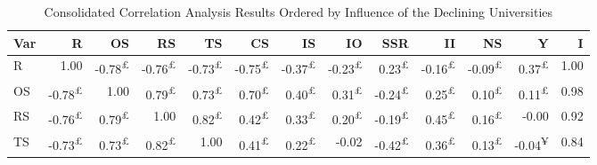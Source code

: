 \documentclass{singlecol-new}
\theoremstyle{TH}{
\newtheorem{lemma}{Lemma}
\newtheorem{theorem}[lemma]{Theorem}
\newtheorem{corrolary}[lemma]{Corrolary}
\newtheorem{conjecture}[lemma]{Conjecture}
\newtheorem{proposition}[lemma]{Proposition}
\newtheorem{claim}[lemma]{Claim}
\newtheorem{stheorem}[lemma]{Wrong Theorem}
\newtheorem{algorithm}{Algorithm}
}
\theoremstyle{THrm}{
\newtheorem{definition}{Definition}[section]
\newtheorem{question}{Question}[section]
\newtheorem{remark}{Remark}
\newtheorem{scheme}{Scheme}
}
\theoremstyle{THhit}{
\newtheorem{case}{Case}[section]
}
\begin{document}
\begin{table*}[h!]
	\centering
	\caption{Consolidated Correlation Analysis Results Ordered by Influence of the Declining Universities}
	\label{tab:correlation_combined_colored}
	\scriptsize
	\begin{tabular}{|l|r|r|r|r|r|r|r|r|r|r|r|r|}
		\hline
		\textbf{Var} & \textbf{R} & \textbf{OS} & \textbf{RS} & \textbf{TS} & \textbf{CS} & \textbf{IS} & \textbf{IO} & \textbf{SSR} & \textbf{II} & \textbf{NS} & \textbf{Y} & \textbf{I} \\ \hline
		
		R & \cellcolor{gray!50}1.00 & \cellcolor{gray!39}-0.78\textsuperscript{£} & \cellcolor{gray!38}-0.76\textsuperscript{£} & \cellcolor{gray!36}-0.73\textsuperscript{£} & \cellcolor{gray!37}-0.75\textsuperscript{£} & \cellcolor{gray!18}-0.37\textsuperscript{£} & \cellcolor{gray!11}-0.23\textsuperscript{£} & \cellcolor{gray!11}0.23\textsuperscript{£} & \cellcolor{gray!8}-0.16\textsuperscript{£} & \cellcolor{gray!4}-0.09\textsuperscript{£} & \cellcolor{gray!18}0.37\textsuperscript{£} & 1.00 \\ \hline
		
		OS & \cellcolor{gray!39}-0.78\textsuperscript{£} & \cellcolor{gray!50}1.00 & \cellcolor{gray!39}0.79\textsuperscript{£} & \cellcolor{gray!36}0.73\textsuperscript{£} & \cellcolor{gray!35}0.70\textsuperscript{£} & \cellcolor{gray!20}0.40\textsuperscript{£} & \cellcolor{gray!15}0.31\textsuperscript{£} & \cellcolor{gray!12}-0.24\textsuperscript{£} & \cellcolor{gray!12}0.25\textsuperscript{£} & \cellcolor{gray!5}0.10\textsuperscript{£} & \cellcolor{gray!5}0.11\textsuperscript{£} & 0.98 \\ \hline
		
		RS & \cellcolor{gray!38}-0.76\textsuperscript{£} & \cellcolor{gray!39}0.79\textsuperscript{£} & \cellcolor{gray!50}1.00 & \cellcolor{gray!41}0.82\textsuperscript{£} & \cellcolor{gray!21}0.42\textsuperscript{£} & \cellcolor{gray!16}0.33\textsuperscript{£} & \cellcolor{gray!10}0.20\textsuperscript{£} & \cellcolor{gray!9}-0.19\textsuperscript{£} & \cellcolor{gray!22}0.45\textsuperscript{£} & \cellcolor{gray!8}0.16\textsuperscript{£} & \cellcolor{gray!0}-0.00 & 0.92 \\ \hline
		
		TS & \cellcolor{gray!36}-0.73\textsuperscript{£} & \cellcolor{gray!36}0.73\textsuperscript{£} & \cellcolor{gray!41}0.82\textsuperscript{£} & \cellcolor{gray!50}1.00 & \cellcolor{gray!20}0.41\textsuperscript{£} & \cellcolor{gray!11}0.22\textsuperscript{£} & \cellcolor{gray!1}-0.02 & \cellcolor{gray!21}-0.42\textsuperscript{£} & \cellcolor{gray!18}0.36\textsuperscript{£} & \cellcolor{gray!6}0.13\textsuperscript{£} & \cellcolor{gray!2}-0.04\textsuperscript{¥} & 0.84 \\ \hline
		

\end{tabular}
\end{table*}
\end{document}
